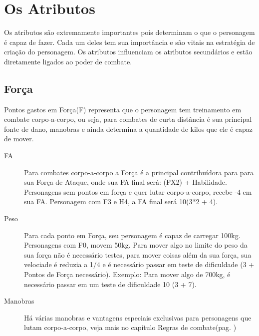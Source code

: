 \chapter{Os Atributos}
\label{ch:attributes}

Os atributos são extremamente importantes pois determinam o que o personagem é capaz de fazer. Cada um deles tem sua importância e são vitais na estratégia de criação do personagem. Os atributos influenciam os atributos secundários e estão diretamente ligados ao poder de combate. 

\section{Força}

Pontos gastos em Força(F) representa que o personagem tem treinamento em combate corpo-a-corpo, ou seja, para combates de curta distância é sua principal fonte de dano, manobras e ainda determina a quantidade de kilos que ele é capaz de mover.

\begin{description}
\item[FA] Para combates corpo-a-corpo a Força é a principal contribuídora para para sua Força de Ataque, onde sua FA final será: (FX2) + Habilidade. Personagens sem pontos em força e quer lutar corpo-a-corpo, recebe -4 em sua FA. Personagem com F3 e H4, a FA final será 10(3*2 + 4). 
\item[Peso] Para cada ponto em Força, seu personagem é capaz de carregar 100kg. Personagens com F0, movem 50kg. Para mover algo no limite do peso da sua força não é necessário testes, para mover coisas além da sua força, sua velociade é reduzia a 1/4 e é necessário passar em teste de dificuldade (3 + Pontos de Força necessário). Exemplo: Para mover algo de 700kg, é necessário passar em um teste de dificuldade 10 (3 + 7).
\item[Manobras] Há várias manobras e vantagens especiais exclusivas para personagens que lutam corpo-a-corpo, veja mais no capítulo Regras de combate(pag. \pageref{ch:combat})
\end{description}


